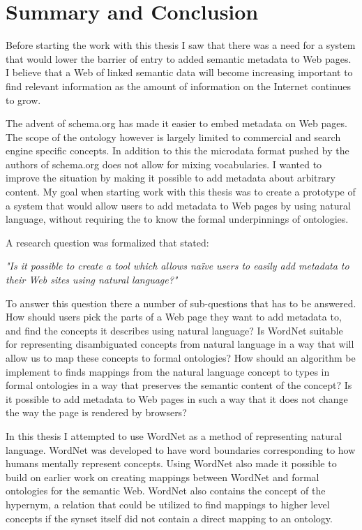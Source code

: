 \chapter{Summary and Conclusion} %
\label{Conclusion} %
Before starting the work with this thesis I saw that there was a need for a system that would lower the barrier of
entry to added semantic metadata to Web pages.
I believe that a Web of linked semantic data will become increasing important to find relevant information as the amount
of information on the Internet continues to grow.

The advent of schema.org has made it easier to embed metadata on Web pages.
The scope of the ontology however is largely limited to commercial and search engine specific concepts.
In addition to this the microdata format pushed by the authors of schema.org does not allow for mixing vocabularies.
I wanted to improve the situation by making it possible to add metadata about arbitrary content.
My goal when starting work with this thesis was to create a prototype of a system that would allow users to add metadata to Web pages by using natural language,
without requiring the to know the formal underpinnings of ontologies.

A research question was formalized that stated:

\emph{"Is it possible to create a tool which allows naïve users to easily add metadata to their Web sites using natural language?"}

To answer this question there a number of sub-questions that has to be answered.
How should users pick the parts of a Web page they want to add metadata to, and find the concepts it describes using natural language?
Is WordNet suitable for representing disambiguated concepts from natural language in a way that will allow us to map these concepts to formal ontologies?
How should an algorithm be implement to finds mappings from the natural language concept to types in
formal ontologies in a way that preserves the semantic content of the concept?
Is it possible to add metadata to Web pages in such a way that it does not change the way the page is rendered by browsers?

In this thesis I attempted to use WordNet as a method of representing natural language.
WordNet was developed to have word boundaries corresponding to how humans mentally represent concepts.
Using WordNet also made it possible to  build on earlier work on creating mappings between WordNet and formal ontologies for the semantic Web.
WordNet also contains the concept of the hypernym, a relation that could be utilized to find mappings to higher level concepts
if the synset itself did not contain a direct mapping to an ontology.

